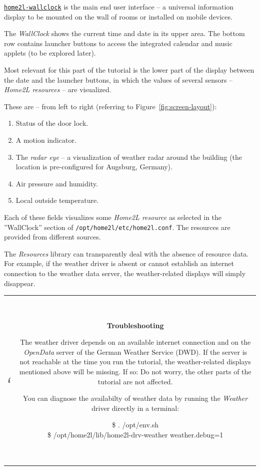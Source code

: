 \documentclass[12pt,english,parskip=half]{scrreprt}
\newcommand{\lstbox}[1]{
  \par
  \colorbox{lstbackground}{\ttfamily\footnotesize{\parbox{\linewidth}{#1}}}
  \par
}
\newcommand{\infobox}[1]{
  \hfill
  \setlength\arrayrulewidth{1pt}
  \begin{tabular}[t]{c|c|}
    \parbox{1.8em}{\hfill\textit{\Huge\textbf{i}\,}}
    &
    \,\parbox{0.89\linewidth}{\setlength{\parskip}{0.5em}#1}\,
  \end{tabular}
  \par
}
\newcommand{\idx}[1]{#1\index{#1}}
\newcommand{\toolref}[1]{\hyperref[tool:#1]{\texttt{\idx{#1}}}}
\begin{document}
\toolref{home2l-wallclock} is the main end user interface -- a universal information display
to be mounted on the wall of rooms or installed on mobile devices.

The \emph{WallClock} shows the current time and date in its upper area.
The bottom row contains launcher buttons to access the integrated
calendar and music applets (to be explored later).

Most relevant for this part of the tutorial is the lower part of the
display between the date and the launcher buttons, in which the values of
several sensors -- \emph{Home2L resources} -- are visualized.

These are -- from left to right (referring to Figure~\ref{fig:screen-layout}):

\begin{enumerate}
\item
  Status of the door lock.
\item
  A motion indicator.
\item
  The \emph{radar eye} -- a visualization of weather radar around the building
  (the location is pre-configured for Augsburg, Germany).
\item
  Air pressure and humidity.
\item
  Local outside temperature.
\end{enumerate}

Each of these fields visualizes some \emph{Home2L resource} as
selected in the ''WallClock'' section of \texttt{/opt/home2l/etc/home2l.conf}.
The resources are provided from different sources.

The \emph{Resources} library can transparently deal with the
absence of resource data. For example, if the weather driver is absent
or cannot establish an internet connection to the weather data server,
the weather-related displays will simply disappear.

\infobox{
  \textbf{Troubleshooting}

  The weather driver depends on an available internet connection and on the \textit{OpenData} server of
  the German Weather Service (DWD). If the server is not reachable at the time you run the
  tutorial, the weather-related displays mentioned above will be missing. If so: Do not worry, the other
  parts of the tutorial are not affected.

  You can diagnose the availabilty of weather data by running the \emph{Weather} driver directly
  in a terminal:
  \lstbox{
    \$ . /opt/env.sh\\
    \$ /opt/home2l/lib/home2l-drv-weather weather.debug=1
  }
}
\end{document}
